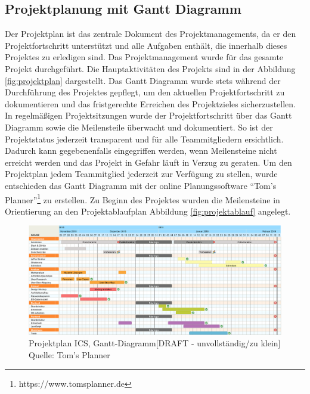 	\subsection{Projektplanung mit Gantt Diagramm}
	Der Projektplan ist das zentrale Dokument des Projektmanagements, da er den Projektfortschritt unterstützt und alle Aufgaben enthält, die innerhalb dieses Projektes zu erledigen sind. Das Projektmanagement wurde für das gesamte Projekt durchgeführt. Die Hauptaktivitäten des Projekts sind in der Abbildung \vref{fig:projektplan} dargestellt. Das Gantt Diagramm wurde stets während der Durchführung des Projektes gepflegt, um den aktuellen Projektfortschritt zu dokumentieren und das fristgerechte Erreichen des Projektzieles sicherzustellen. In regelmäßigen Projektsitzungen wurde der Projektfortschritt über das Gantt Diagramm sowie die Meilensteile überwacht und dokumentiert. So ist der Projektstatus jederzeit transparent und für alle Teammitgliedern ersichtlich. Dadurch kann gegebenenfalls eingegriffen werden, wenn Meilensteine nicht erreicht werden und das Projekt in Gefahr läuft in Verzug zu geraten.  
	Um den Projektplan jedem Teammitglied jederzeit zur Verfügung zu stellen, wurde entschieden das Gantt Diagramm mit der online Planungssoftware \enquote{Tom's Planner}\footnote{https://www.tomsplanner.de} zu erstellen. Zu Beginn des Projektes wurden die Meilensteine in Orientierung an den Projektablaufplan Abbildung \vref{fig:projektablauf} angelegt. 
	\begin{figure}[H]
		\centering 
		\includegraphics[scale=0.3]{img/projektplan.png}
		\captionsetup{format=hang}
		\caption[Projektplan]{\label{fig:projektplan} Projektplan ICS, Gantt-Diagramm[DRAFT - unvollständig/zu klein] \\ Quelle: Tom's Planner}
	\end{figure}
